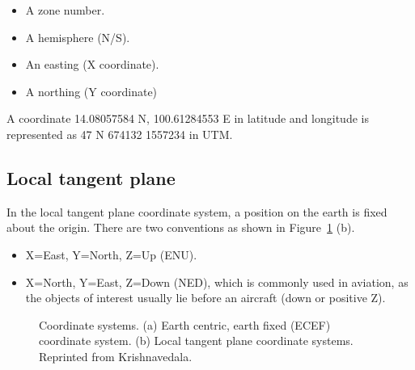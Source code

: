 \begin{itemize}
        \item A zone number.
        \item A hemisphere (N/S).
        \item An easting (X coordinate).
        \item A northing (Y coordinate)
\end{itemize}

A coordinate 14.08057584 \degree N, 100.61284553 \degree E in latitude and longitude is represented as 47 N 674132 1557234 in UTM.

\subsection{Local tangent plane}

In the local tangent plane coordinate system, a position on the earth is fixed about the origin. There are two conventions as shown in Figure~\ref{fig:coordinatesystem} (b).

\begin{itemize}
	\item X=East, Y=North, Z=Up (ENU).
	\item X=North, Y=East, Z=Down (NED), which is commonly used in aviation, as the objects of interest usually lie before an aircraft (down or positive Z).
\end{itemize}

\begin{figure}%
	\centering
	\caption[ECEF coordinate system]{\small Coordinate systems. (a) Earth centric, earth fixed (ECEF) coordinate system. (b) Local tangent plane coordinate systems. Reprinted from Krishnavedala. 
	}%
	\label{fig:coordinatesystem}%
\end{figure}

